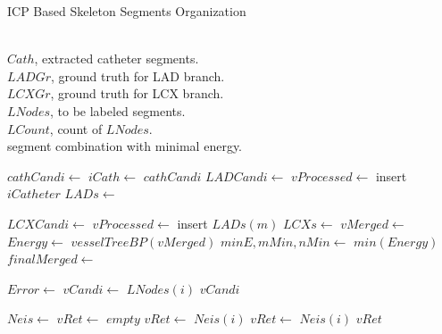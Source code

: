 \documentclass[journal]{IEEEtran}
\begin{document}
\begin{algorithm}
  \caption{ICP Based Skeleton Segments Organization}
  \label{alg:icp_matching}
  \renewcommand{\algorithmicrequire}{\textbf{Input:}}
  \renewcommand{\algorithmicensure}{\textbf{Output:}}
  \begin{algorithmic}[]
  \Require ~~\\
    $Cath$, extracted catheter segments.\\
    $LADGr$, ground truth for LAD branch.\\
    $LCXGr$, ground truth for LCX branch.\\
    $LNodes$, to be labeled segments.\\
    $LCount$, count of $LNodes$.
  \Ensure ~~\\
    segment combination with minimal energy.
  \State

  \State $cathCandi \gets$ 
  \State $iCath \gets$ $cathCandi$
  \State $LADCandi \gets$ 
  \State $vProcessed \gets$ insert $iCatheter$
  \State $LADs\gets$ 

    \State $LCXCandi \gets$ 
    \State $vProcessed \gets$ insert $LADs(m)$
    \State $LCXs \gets$ 
        \State $vMerged \gets$ 
        \State $Energy \gets$ $vesselTreeBP(vMerged)$
    \EndFor
  \EndFor
  \State $minE,mMin,nMin \gets$ $min(Energy)$
  \State $finalMerged \gets$ 
  \EndFunction
  \State

       \State $Error \gets$ 
        \State $vCandi \gets$ $LNodes(i)$
       \EndIf
    \EndFor
    \State \Return $vCandi$
  \EndFunction
  \State

  \State $Neis \gets$ 
  \State $vRet \gets$ $empty$
                    \State $vRet \gets$ $Neis(i)$
                \Else
                     \State $vRet \gets$ $Neis(i)$
                     \State {}
                \EndIf
            \EndIf
        \EndIf
    \EndFor
        \State \Return $vRet$
    \EndIf
  \EndFunction
  \end{algorithmic}
\end{algorithm}
\end{document}
